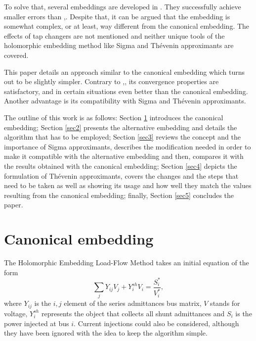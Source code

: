 \documentclass[conference]{IEEEtran}
\begin{document}
To solve that, several embeddings are developed in \cite{wallace}. They successfully achieve smaller errors than \cite{subramanianPV},\cite{Subramanian}. Despite that, it can be argued that the embedding is somewhat complex, or at least, way different from the canonical embedding. The effects of tap changers are not mentioned and neither unique tools of the holomorphic embedding method like Sigma and Thévenin approximants are covered. 

This paper details an approach similar to the canonical embedding which turns out to be slightly simpler. Contrary to \cite{Novel},\cite{Schmidt},\cite{subramanianPV} its convergence properties are satisfactory, and in certain situations even better than the canonical embedding. Another advantage is its compatibility with Sigma and Thévenin approximants. 

The outline of this work is as follows: Section \ref{sec1} introduces the canonical embedding; Section \ref{sec2} presents the alternative embedding and details the algorithm that has to be employed; Section \ref{sec3} reviews the concept and the importance of Sigma approximants, describes the modification needed in order to make it compatible with the alternative embedding and then, compares it with the results obtained with the canonical embedding; Section \ref{sec4} depicts the formulation of Thévenin approximants, covers the changes and the steps that need to be taken as well as showing its usage and how well they match the values resulting from the canonical embedding; finally, Section \ref{sec5} concludes the paper.

\section{Canonical embedding} \label{sec1}
The Holomorphic Embedding Load-Flow Method takes an initial equation of the form
\begin{equation}
  \sum_{j} Y_{ij}V_j + Y_i^{sh}V_i=\frac{S^*_i}{V^*_i},\label{eq:1}
\end{equation}
where $Y_{ij}$ is the $i,j$ element of the series admittances bus matrix, $V$ stands for voltage, $Y^{sh}_i$ represents the object that collects all shunt admittances and $S_i$ is the power injected at bus $i$. Current injections could also be considered, although they have been ignored with the idea to keep the algorithm simple.  
\end{document}
